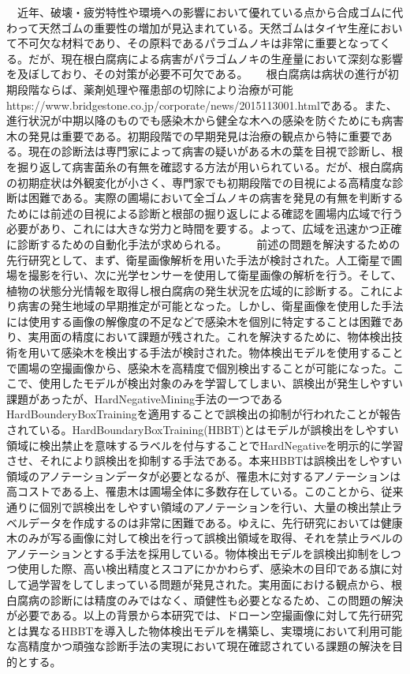 　近年、破壊・疲労特性や環境への影響において優れている点から合成ゴムに代わって天然ゴムの重要性の増加が見込まれている。天然ゴムはタイヤ生産において不可欠な材料であり、その原料であるパラゴムノキは非常に重要となってくる。だが、現在根白腐病による病害がパラゴムノキの生産量において深刻な影響を及ぼしており、その対策が必要不可欠である。
　
 根白腐病は病状の進行が初期段階ならば、薬剤処理や罹患部の切除により治療が可能{https://www.bridgestone.co.jp/corporate/news/2015113001.html}である。また、進行状況が中期以降のものでも感染木から健全な木への感染を防ぐためにも病害木の発見は重要である。初期段階での早期発見は治療の観点から特に重要である。現在の診断法は専門家によって病害の疑いがある木の葉を目視で診断し、根を掘り返して病害菌糸の有無を確認する方法が用いられている。だが、根白腐病の初期症状は外観変化が小さく、専門家でも初期段階での目視による高精度な診断は困難である。実際の圃場において全ゴムノキの病害を発見の有無を判断するためには前述の目視による診断と根部の掘り返しによる確認を圃場内広域で行う必要があり、これには大きな労力と時間を要する。よって、広域を迅速かつ正確に診断するための自動化手法が求められる。
　
　前述の問題を解決するための先行研究として、まず、衛星画像解析を用いた手法が検討された。人工衛星で圃場を撮影を行い、次に光学センサーを使用して衛星画像の解析を行う。そして、植物の状態分光情報を取得し根白腐病の発生状況を広域的に診断する。これにより病害の発生地域の早期推定が可能となった。しかし、衛星画像を使用した手法には使用する画像の解像度の不足などで感染木を個別に特定することは困難であり、実用面の精度において課題が残された。これを解決するために、物体検出技術を用いて感染木を検出する手法が検討された。物体検出モデルを使用することで圃場の空撮画像から、感染木を高精度で個別検出することが可能になった。ここで、使用したモデルが検出対象のみを学習してしまい、誤検出が発生しやすい課題があったが、HardNegativeMining手法の一つであるHardBounderyBoxTrainingを適用することで誤検出の抑制が行われたことが報告されている。HardBoundaryBoxTraining(HBBT)とはモデルが誤検出をしやすい領域に検出禁止を意味するラベルを付与することでHardNegativeを明示的に学習させ、それにより誤検出を抑制する手法である。本来HBBTは誤検出をしやすい領域のアノテーションデータが必要となるが、罹患木に対するアノテーションは高コストである上、罹患木は圃場全体に多数存在している。このことから、従来通りに個別で誤検出をしやすい領域のアノテーションを行い、大量の検出禁止ラベルデータを作成するのは非常に困難である。ゆえに、先行研究においては健康木のみが写る画像に対して検出を行って誤検出領域を取得、それを禁止ラベルのアノテーションとする手法を採用している。物体検出モデルを誤検出抑制をしつつ使用した際、高い検出精度とスコアにかかわらず、感染木の目印である旗に対して過学習をしてしまっている問題が発見された。実用面における観点から、根白腐病の診断には精度のみではなく、頑健性も必要となるため、この問題の解決が必要である。以上の背景から本研究では、ドローン空撮画像に対して先行研究とは異なるHBBTを導入した物体検出モデルを構築し、実環境において利用可能な高精度かつ頑強な診断手法の実現において現在確認されている課題の解決を目的とする。
 
